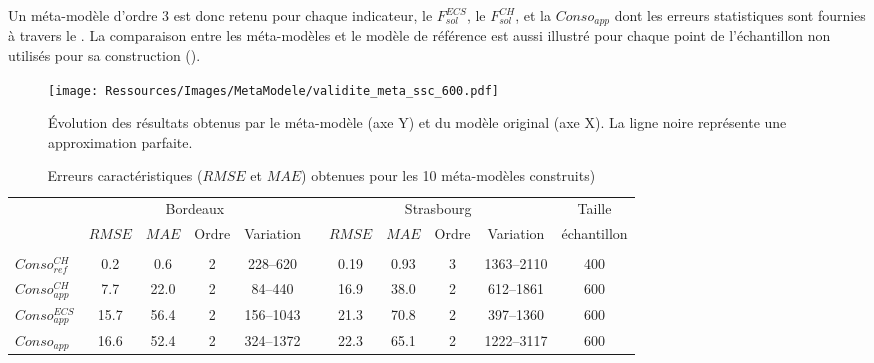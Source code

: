 Un méta-modèle d’ordre \num{3} est donc retenu pour chaque indicateur, le $F_{sol}^{ECS}$, le $F_{sol}^{CH}$,
et la $Conso_{app}$ dont les erreurs statistiques sont fournies à travers le .
La comparaison entre les méta-modèles et le modèle de référence est aussi illustré pour chaque
point de l’échantillon non utilisés pour sa construction ().

\begin{figure}
    \centering
    \texttt{[image: Ressources/Images/MetaModele/validite\_meta\_ssc\_600.pdf]}
    \caption[Évaluation de la validité des méta-modèles du ]
            {Évolution des résultats obtenus par le méta-modèle (axe Y) et du modèle
             original (axe X). La ligne noire représente une approximation parfaite.}
    \label{fig:validite_meta_ssc}
\end{figure}

\begin{table}
\centering
\caption{Erreurs caractéristiques ($RMSE$ et $MAE$) obtenues pour les \num{10} méta-modèles
         construits)
\label{tab:meta_result_bilan}}
\begin{tabular}{l c c c c c c c c c c}
    \toprule
                    & \multicolumn{4}{c}{Bordeaux} & & \multicolumn{4}{c}{Strasbourg} &
                      Taille \\
                    \cmidrule(r){2-5}
                    \cmidrule(r){7-10}
                    & $RMSE$ & $MAE$  & Ordre & Variation  &       & $RMSE$ & $MAE$ & Ordre & Variation & échantillon \\                        \\
    \midrule
    $Conso_{ref}^{CH}$  & 0.2  & 0.6  & 2 & \numrange{228}{620}&   & 0.19   & 0.93  & 3     & \numrange{1363}{2110} & \num{400}  \\
    \addlinespace[\defaultaddspace]
    $Conso_{app}^{CH}$  & 7.7  & 22.0 & 2 & \numrange{84}{440} &   & 16.9   & 38.0  & 2     & \numrange{612}{1861}       & \num{600} \\
    \addlinespace[\defaultaddspace]
    $Conso_{app}^{ECS}$ & 15.7 & 56.4 & 2 & \numrange{156}{1043}&  & 21.3   & 70.8  & 2     & \numrange{397}{1360}       & \num{600} \\
    \addlinespace[\defaultaddspace]
    $Conso_{app}$       & 16.6 & 52.4 & 2 & \numrange{324}{1372}&  & 22.3   & 65.1  & 2     & \numrange{1222}{3117}       & \num{600} \\
    \bottomrule
\end{tabular}
\end{table}


